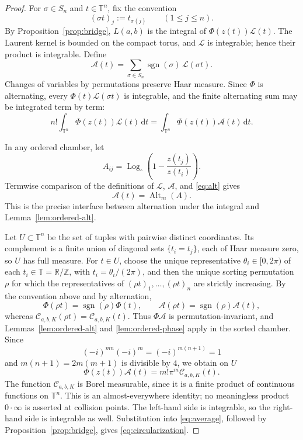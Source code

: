 \documentclass[11pt,a4paper]{article}
\theoremstyle{definition}
\newcommand{\Alt}{\operatorname{Alt}}
\newcommand{\sgn}{\operatorname{sgn}}
\newcommand{\T}{\mathbb T}
\newcommand{\dd}{\,\mathrm d}
\newcommand{\Logc}{\operatorname{Log}_{\circ}}
\begin{document}
\begin{proof}
For $\sigma\in S_n$ and $t\in\T^n$, fix the convention
\[
 (\sigma t)_j:=t_{\sigma(j)}\qquad(1\le j\le n).
\]
By Proposition~\ref{prop:bridge}, $L(a,b)$ is the integral of
$\Phi(z(t))\mathcal L(t)$. The Laurent kernel is bounded on the compact
torus, and $\mathcal L$ is integrable; hence their product is integrable.
Define
\[
\mathcal A(t)=\sum_{\sigma\in S_n}\sgn(\sigma)\,
\mathcal L(\sigma t).
\]
Changes of variables by permutations preserve Haar measure. Since
$\Phi$ is alternating, every
$\Phi(t)\mathcal L(\sigma t)$ is integrable, and the finite alternating
sum may be integrated term by term:
\begin{equation}\label{eq:average}
n!\int_{\T^n}\Phi(z(t))\mathcal L(t)\dd t
=\int_{\T^n}\Phi(z(t))\mathcal A(t)\dd t.
\end{equation}

In any ordered chamber, let
\[
 A_{ij}=\Logc\!\left(1-\frac{z(t_j)}{z(t_i)}\right).
\]
Termwise comparison of the definitions of $\mathcal L$, $\mathcal A$,
and \eqref{eq:alt} gives
\begin{equation}\label{eq:A-is-alt}
 \mathcal A(t)=\Alt_m(A).
\end{equation}
This is the precise interface between alternation under the integral and
Lemma~\ref{lem:ordered-alt}.

Let $U\subset\T^n$ be the set of tuples with pairwise distinct
coordinates. Its complement is a finite union of diagonal sets
$\{t_i=t_j\}$, each of Haar measure zero, so $U$ has full measure. For
$t\in U$, choose the unique representative
$\theta_i\in[0,2\pi)$ of each $t_i\in\T=\mathbb R/\mathbb Z$, with
$t_i=\theta_i/(2\pi)$, and then the unique sorting permutation $\rho$
for which the representatives of
$(\rho t)_1,\ldots,(\rho t)_n$ are strictly increasing. By the convention
above and by alternation,
\[
\Phi(\rho t)=\sgn(\rho)\Phi(t),\qquad
\mathcal A(\rho t)=\sgn(\rho)\mathcal A(t),
\]
whereas
$\mathcal C_{a,b,K}(\rho t)=\mathcal C_{a,b,K}(t)$. Thus
$\Phi\mathcal A$ is permutation-invariant, and
Lemmas~\ref{lem:ordered-alt} and \ref{lem:ordered-phase} apply in the
sorted chamber. Since
\[
(-i)^{mn}(-i)^m=(-i)^{m(n+1)}=1
\]
and $m(n+1)=2m(m+1)$ is divisible by $4$, we obtain on $U$
\[
 \Phi(z(t))\mathcal A(t)=m!\pi^m\mathcal C_{a,b,K}(t).
\]
The function $\mathcal C_{a,b,K}$ is Borel measurable, since it is a
finite product of continuous functions on $\T^n$.
This is an almost-everywhere identity; no meaningless product
$0\cdot\infty$ is asserted at collision points. The left-hand side is
integrable, so the right-hand side is integrable as well. Substitution
into \eqref{eq:average}, followed by Proposition~\ref{prop:bridge},
gives \eqref{eq:circularization}.
\end{proof}
\end{document}

